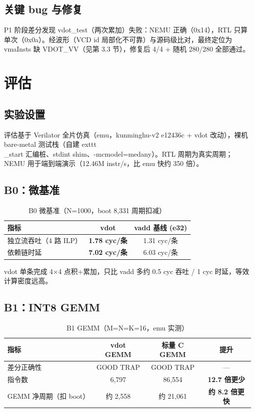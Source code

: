 \documentclass[11pt]{article}
\begin{document}
\subsection{关键 bug 与修复}
P1 阶段差分发现 vdot\_test（两次累加）失败：NEMU 正确（0x14），RTL 只算单次（0x0a）。经波形（VCD id 局部化不可靠）与源码级比对，最终定位为 vmaInsts 缺 VDOT\_VV（见第 3.3 节），修复后 4/4 + 随机 280/280 全部通过。

\section{评估}
\subsection{实验设置}
评估基于 Verilator 全片仿真（emu，kunminghu-v2 e12436c + vdot 改动），裸机 bare-metal 测试栈（自建 	exttt{\\_start} 汇编桩、stdint shim、-mcmodel=medany）。RTL 周期为真实周期；NEMU 用于端到端演示（12.46M instr/s，比 emu 快约 350 倍）。

\subsection{B0：微基准}
\begin{table}[htbp]
\centering
\caption{B0 微基准（N=1000，boot 8,331 周期扣减）}
\label{tab:b0}
\begin{tabular}{l c c}
\toprule
\textbf{指标} & \textbf{vdot} & \textbf{vadd 基线 (e32)} \\
\midrule
独立流吞吐（4 路 ILP） & \textbf{1.78 cyc/条} & 1.31 cyc/条 \\
依赖链时延 & \textbf{7.02 cyc/条} & 6.03 cyc/条 \\
\bottomrule
\end{tabular}
\end{table}
vdot 单条完成 4$\times$4 点积+累加，只比 vadd 多约 0.5 cyc 吞吐 / 1 cyc 时延，等效计算密度远高。

\subsection{B1：INT8 GEMM}
\begin{table}[htbp]
\centering
\caption{B1 GEMM（M=N=K=16，emu 实测）}
\label{tab:b1}
\begin{tabular}{l c c c}
\toprule
\textbf{指标} & \textbf{vdot GEMM} & \textbf{标量 C GEMM} & \textbf{提升} \\
\midrule
差分正确性 & GOOD TRAP & GOOD TRAP & --- \\
指令数 & 6,797 & 86,554 & \textbf{12.7 倍更少} \\
GEMM 净周期（扣 boot） & 约 2,558 & 约 21,061 & \textbf{约 8.2 倍更快} \\
\bottomrule
\end{tabular}
\end{table}
\end{document}
